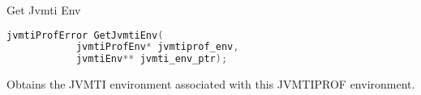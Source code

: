 \begin{apidef}{Get Jvmti Env}
\begin{lstlisting}[language=C]
jvmtiProfError GetJvmtiEnv(
            jvmtiProfEnv* jvmtiprof_env,
            jvmtiEnv** jvmti_env_ptr);
\end{lstlisting}

\begin{apidesc}
Obtains the JVMTI environment associated with this JVMTIPROF environment.
\end{apidesc}

\begin{apiphase}
\apiphaseany
\end{apiphase}

\begin{apicap}
\apicaprequired
\end{apicap}

\begin{apiparam}
\end{apiparam}

\apireturnempty

\begin{apierror}
\end{apierror}
\end{apidef}
